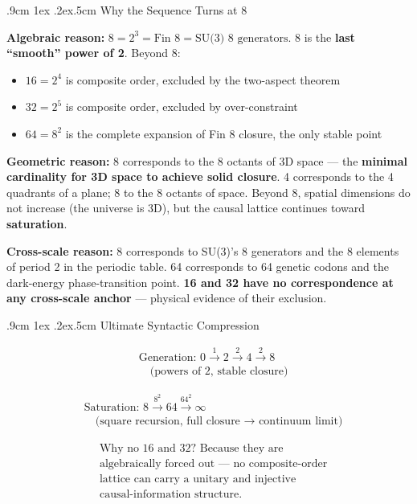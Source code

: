 \documentclass[aps,prd,twocolumn,nofootinbib,floatfix]{revtex4-2}
\makeatletter
\def\subsection{%
  \@startsection{subsection}{2}{\z@}
    {.9cm \@plus1ex \@minus .2ex}{.5cm}
    {\normalfont\normalsize\bfseries\centering}%
}
\makeatother
\begin{document}
\subsection{Why the Sequence Turns at 8}

\textbf{Algebraic reason:} $8 = 2^3 = \text{Fin 8} = \text{SU(3) 8 generators}$. 8 is the \textbf{last ``smooth'' power of 2}. Beyond 8:
\begin{itemize}
    \item $16 = 2^4$ is composite order, excluded by the two-aspect theorem
    \item $32 = 2^5$ is composite order, excluded by over-constraint
    \item $64 = 8^2$ is the complete expansion of Fin 8 closure, the only stable point
\end{itemize}

\textbf{Geometric reason:} 8 corresponds to the 8 octants of 3D space --- the \textbf{minimal cardinality for 3D space to achieve solid closure}. 4 corresponds to the 4 quadrants of a plane; 8 to the 8 octants of space. Beyond 8, spatial dimensions do not increase (the universe is 3D), but the causal lattice continues toward \textbf{saturation}.

\textbf{Cross-scale reason:} 8 corresponds to SU(3)'s 8 generators and the 8 elements of period 2 in the periodic table. 64 corresponds to 64 genetic codons and the dark-energy phase-transition point. \textbf{16 and 32 have no correspondence at any cross-scale anchor} --- physical evidence of their exclusion.

\subsection{Ultimate Syntactic Compression}

\[
\boxed{
\begin{aligned}
&\text{Generation: } 0 \xrightarrow{1} 2 \xrightarrow{2} 4 \xrightarrow{2} 8 \\
&\quad\text{(powers of 2, stable closure)}
\end{aligned}
}
\]

\[
\boxed{
\begin{aligned}
&\text{Saturation: } 8 \xrightarrow{8^2} 64 \xrightarrow{64^2} \infty \\
&\quad\text{(square recursion, full closure } \to \text{ continuum limit)}
\end{aligned}
}
\]

\[
\boxed{
\begin{aligned}
&\text{Why no 16 and 32? Because they are} \\
&\text{algebraically forced out --- no composite-order} \\
&\text{lattice can carry a unitary and injective} \\
&\text{causal-information structure.}
\end{aligned}
}
\]
\end{document}
